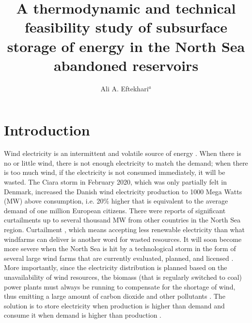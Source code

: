 \documentclass{ECOS_2021}
\title{\sffamily A thermodynamic and technical feasibility study of subsurface storage of energy in the North Sea abandoned reservoirs}
\author{Ali A. Eftekhari$^{a}$}
\begin{document}

\sffamily \section{Introduction} \label{chap:Problem-definition} 
 \normalsize
Wind electricity is an intermittent and volatile source of energy
\cite{gibescuEstimationVariabilityPredictability2009,ummelsImpactsWindPower2007}.
When there is no or little wind, there is not enough electricity to
match the demand; when there is too much wind, if the electricity
is not consumed immediately, it will be wasted. The Ciara storm in
February 2020, which was only partially felt in Denmark, increased
the Danish wind electricity production to 1000 Mega Watts (MW) above
consumption, i.e. 20\% higher that is equivalent to the average demand
of one million European citizens. There were reports of significant
curtailments up to several thousand MW from other countries in the
North Sea region. Curtailment \cite{lewWindSolarCurtailment2013},
which means accepting less renewable electricity than what windfarms
can deliver is another word for wasted resources. It will soon become
more severe when the North Sea is hit by a technological storm in
the form of several large wind farms that are currently evaluated,
planned, and licensed \cite{GlobalOffshoreRenewable}. More importantly,
since the electricity distribution is planned based on the unavailability
of wind resources, the biomass (that is regularly switched to coal)
power plants must always be running to compensate for the shortage
of wind, thus emitting a large amount of carbon dioxide and other
pollutants \cite{meibomEnergyComesTogether2013}. The solution is
to store electricity when production is higher than demand and consume
it when demand is higher than production \cite{pedersenEnergyStorageTechnologies2019}. 
\end{document}
